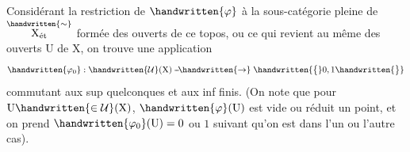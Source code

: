 \clearpage
{}

\newsavebox{\coteFourTypescript}
\begin{lrbox}{\coteFourTypescript}
\begin{minipage}[t]{.96\linewidth}
Considérant la restriction de $\handwritten{\varphi}$ à la sous-catégorie pleine de $\overset{\handwritten{\sim}}{\mathrm{X}_{\text{ét}}}$ formée des ouverts de ce topos, ou ce qui revient au même  des ouverts $\mathrm U$ de $\mathrm X$, on trouve une application
\[
\handwritten{\varphi_{0}}:\handwritten{\mathcal U}(\mathrm X)\mathrel{\mbox{-}\mkern-2mu\mbox{-}\mkern-3mu\handwritten{\to}}\handwritten{\bigl\{}0,1\handwritten{\bigr\}}
\]
commutant aux sup quelconques et aux inf finis. (On note que pour $\mathrm U\handwritten{\in\mathcal U}(\mathrm X)$, $\handwritten{\varphi}(\mathrm U)$ est vide ou réduit un point, et on prend $\handwritten{\varphi_{0}}(\mathrm U)=0$ ou $1$ suivant qu'on est dans l'un ou l'autre cas).


\end{minipage}
\end{lrbox}
